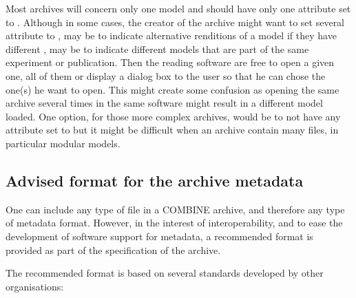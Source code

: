 Most archives will concern only one model and should have only one  attribute set to . Although in some cases, the creator of the archive might want to set several  attribute to , may be to indicate alternative renditions of a model if they have different , may be to indicate different models that are part of the same experiment or publication. Then the reading software are free to open a given one, all of them or display a dialog box to the user so that he can chose the one(s) he want to open. This might create some confusion as opening the same archive several times in the same software might result in a different model loaded. One option, for those more complex archives, would be to not have any  attribute set to  but it might be difficult when an archive contain many files, in particular modular models.


\subsection{Advised format for the archive metadata}

One can include any type of file in a COMBINE archive, and therefore any 
type of metadata format. However, in the interest of interoperability, 
and to ease the development of software support for metadata, a 
recommended format is provided as part of the specification of the 
archive. 

The recommended format is based on several standards developed by other 
organisations: 

